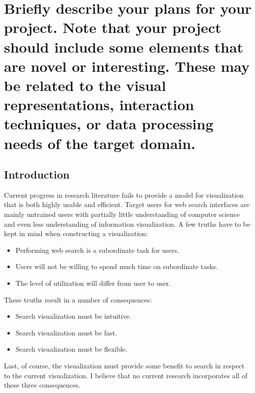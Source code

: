 \section{Briefly describe your plans for your project. Note that your project should include some elements that are novel or interesting. These may be related to the visual representations, interaction techniques, or data processing needs of the target domain.}

\subsection{Introduction}
Current progress in research literature fails to provide a model for visualization that is both highly usable and efficient. Target users for web search interfaces are mainly untrained users with partially little understanding of computer science and even less understanding of information visualization. A few truths have to be kept in mind when constructing a visualization:
\begin{itemize}
	\item Performing web search is a subordinate task for users.
	\item	Users will not be willing to spend much time on subordinate
				tasks.
	\item The level of utilization will differ from user to user.
\end{itemize}
These truths result in a number of consequences:
\begin{itemize}
	\item Search visualization must be intuitive.
	\item Search visualization must be fast.
	\item Search visualization must be flexible.
\end{itemize}
Last, of course, the visualization must provide some benefit to search in respect to the current visualization. I believe that no current research incorporates all of these three consequences. 

